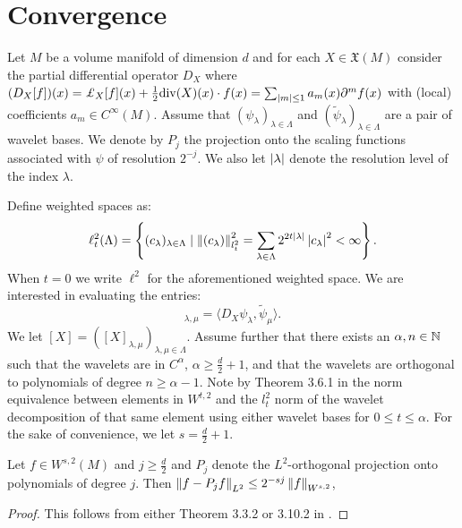 \section{Convergence}

Let $M$ be a volume manifold of dimension $d$ and for each $X \in \mathfrak{X}(M)$ consider the partial differential operator $D_X$ where $(D_X [f] )(x) = \pounds_X[f] (x)+ \frac{1}{2} \mathrm{div}(X)(x) \cdot f(x) = \sum_{\abs{m}\leq 1} a_m(x) \partial^m f(x)$ with (local) coefficients $a_m \in C^{\infty}(M)$. Assume that $(\psi_\lambda)_{\lambda \in \Lambda}$ and $(\tilde{\psi}_\lambda)_{\lambda \in \Lambda}$ are a pair of wavelet bases. We denote by $P_j$ the projection onto the scaling functions associated with $\psi$ of resolution $2^{-j}$. We also let ${\lvert\lambda\rvert}$ denote the resolution level of the index $\lambda$. 

Define weighted spaces as:
\begin{equation}
	\ell_t^2(\Lambda) = \left\{ (c_\lambda)_{\lambda \in \Lambda}  \mid \left\| (c_\lambda) \right\|_{l^2_t}^2 = \sum_{\lambda \in \Lambda} 2^{2t{\lvert\lambda\rvert}}\left| c_\lambda \right|^2 < \infty  \right\}.
\end{equation}
When $t = 0$ we write $\ell^2$ for the aforementioned weighted space. We are interested in evaluating the entries:
\begin{equation}
	[X]_{\lambda,\mu} = \langle D_X \psi_\lambda, \tilde{\psi}_\mu \rangle.
\end{equation}
We let $[X]=([X]_{\lambda,\mu})_{\lambda,\mu \in \Lambda}$. Assume further that there exists an $\alpha,n \in \mathbb{N}$ such that the wavelets are in $C^{\alpha}$, $\alpha \geq \frac{d}{2} + 1$, and that the wavelets are orthogonal to polynomials of degree $n \geq \alpha - 1$.  Note by Theorem 3.6.1 in \cite{Cohen2003} the norm equivalence between elements in $W^{t,2}$ and the $l_t^2$ norm of the wavelet decomposition of that same element using either wavelet bases for $0\leq t \leq \alpha$. For the sake of convenience, we let $s = \frac{d}{2} + 1$. 

\begin{lemma} \label{lem:projection_bound}
	Let $f \in W^{s,2}(M)$ and $j \geq \frac{d}{2}$ and $P_j$ denote the $L^2$-orthogonal projection onto polynomials of degree $j$.
	Then $\left\| f - P_j f \right\|_{L^2} \leq  2^{-sj}\left\| f \right\|_{W^{s,2}}$,
\end{lemma}
\begin{proof}
	This follows from either Theorem 3.3.2 or 3.10.2 in \cite{Cohen2003}.
\end{proof}

